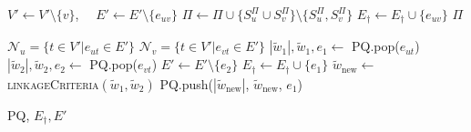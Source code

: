 \documentclass[10pt,twocolumn,letterpaper]{article}
\begin{document}
\begin{algorithm}
\begin{algorithmic}[1]
          \State $V' \gets V' \setminus \{ v\}$, $\quad E' \gets E' \setminus \{ e_{uv}\}$
          \State $\Pi \gets \Pi \cup \{ S_u^\Pi \cup S_v^\Pi \} \setminus \{ S_u^\Pi, S_v^\Pi \}$
        \EndIf
          \State $ E_\dagger \gets E_\dagger \cup \{e_{uv} \} $
        \EndIf
      \EndWhile
      \State
      \Return $\Pi$

  \end{algorithmic}
  \hspace*{2cm} 
    \begin{algorithmic}[1]

      \State $\mathcal{N}_u = \{ t \in V' | e_{ut}\in E'  \}$
      \State $\mathcal{N}_v = \{ t \in V' | e_{vt}\in E'  \}$
        \State $|\tilde{w}_1|, \tilde{w}_1, e_1 \gets $ PQ.pop($e_{ut}$)
        \State $|\tilde{w}_2|, \tilde{w}_2, e_2 \gets $ PQ.pop($e_{vt}$)
        \State $E' \gets E' \setminus \{ e_2\}$ %
         
            \State $ E_\dagger \gets E_\dagger \cup \{e_1 \} $
        \EndIf
        \State $\tilde{w}_{\mathrm{new}} \gets$ \textsc{linkageCriteria}$(\tilde{w}_1, \tilde{w}_2)$
        \State PQ.push($|\tilde{w}_{\mathrm{new}}|$, $\tilde{w}_{\mathrm{new}}$,  $e_1$)
        
        
      \EndFor
      
      \State
      \Return PQ, $E_\dagger, E'$


    \EndFunction

  \end{algorithmic}
  
\end{algorithm}
\end{document}
